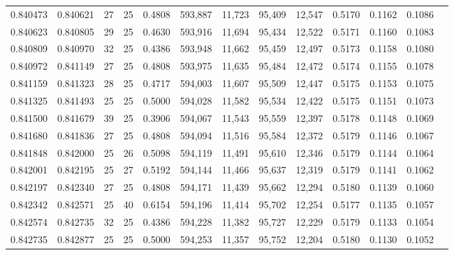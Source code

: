 \begin{tabular}{rrrrrrrrrrrrr}
0.840473 & 0.840621 &    27 &  25 &                                     0.4808 & 593,887 &  11,723 &  95,409 &  12,547 & 0.5170 & 0.1162 & 0.1086 \\
0.840623 & 0.840805 &    29 &  25 &                                     0.4630 & 593,916 &  11,694 &  95,434 &  12,522 & 0.5171 & 0.1160 & 0.1083 \\
0.840809 & 0.840970 &    32 &  25 &                                     0.4386 & 593,948 &  11,662 &  95,459 &  12,497 & 0.5173 & 0.1158 & 0.1080 \\
0.840972 & 0.841149 &    27 &  25 &                                     0.4808 & 593,975 &  11,635 &  95,484 &  12,472 & 0.5174 & 0.1155 & 0.1078 \\
0.841159 & 0.841323 &    28 &  25 &                                     0.4717 & 594,003 &  11,607 &  95,509 &  12,447 & 0.5175 & 0.1153 & 0.1075 \\
0.841325 & 0.841493 &    25 &  25 &                                     0.5000 & 594,028 &  11,582 &  95,534 &  12,422 & 0.5175 & 0.1151 & 0.1073 \\
0.841500 & 0.841679 &    39 &  25 &                                     0.3906 & 594,067 &  11,543 &  95,559 &  12,397 & 0.5178 & 0.1148 & 0.1069 \\
0.841680 & 0.841836 &    27 &  25 &                                     0.4808 & 594,094 &  11,516 &  95,584 &  12,372 & 0.5179 & 0.1146 & 0.1067 \\
0.841848 & 0.842000 &    25 &  26 &                                     0.5098 & 594,119 &  11,491 &  95,610 &  12,346 & 0.5179 & 0.1144 & 0.1064 \\
0.842001 & 0.842195 &    25 &  27 &                                     0.5192 & 594,144 &  11,466 &  95,637 &  12,319 & 0.5179 & 0.1141 & 0.1062 \\
0.842197 & 0.842340 &    27 &  25 &                                     0.4808 & 594,171 &  11,439 &  95,662 &  12,294 & 0.5180 & 0.1139 & 0.1060 \\
0.842342 & 0.842571 &    25 &  40 &                                     0.6154 & 594,196 &  11,414 &  95,702 &  12,254 & 0.5177 & 0.1135 & 0.1057 \\
0.842574 & 0.842735 &    32 &  25 &                                     0.4386 & 594,228 &  11,382 &  95,727 &  12,229 & 0.5179 & 0.1133 & 0.1054 \\
0.842735 & 0.842877 &    25 &  25 &                                     0.5000 & 594,253 &  11,357 &  95,752 &  12,204 & 0.5180 & 0.1130 & 0.1052 \\

\end{tabular}
